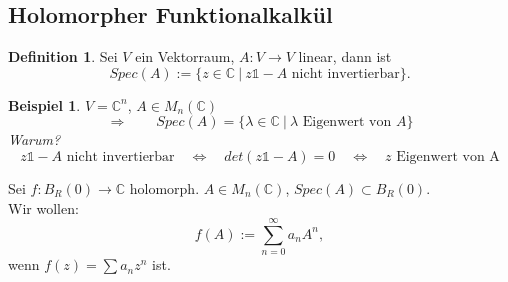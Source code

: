 \documentclass[11pt,titlepage]{article}
\theoremstyle{definition}
\newtheorem{definition}[theorem]{Definition}
\newtheorem{example}[theorem]{Beispiel}
\theoremstyle{remark}
\begin{document}
	\subsection{Holomorpher Funktionalkalkül}
	
	\begin{definition}
		Sei $V$ ein Vektorraum, $A:V\to V$ linear, dann ist
		\[ Spec(A):=\{ z\in\mathbb{C}\ \vert\  z\mathds{1} -A\text{ nicht invertierbar}\}. \]
	\end{definition}
	
	\begin{example}
		$V=\mathbb{C}^n$, $A\in M_n(\mathbb{C})$
		\[ \Rightarrow \qquad Spec(A)=\{\lambda\in\mathbb{C}\ \vert\ \lambda\text{ Eigenwert von }A\}\]
		\textsl{Warum?}
		\[ z\mathds{1}-A\text{ nicht invertierbar} \quad\Leftrightarrow\quad det(z\mathds{1}-A)=0 
		\quad\Leftrightarrow\quad z\text{ Eigenwert von A}\]
	\end{example}
		
	Sei $f:B_R(0)\to\mathbb{C}$ holomorph. $A\in M_n(\mathbb{C})$, $Spec(A)\subset B_R(0)$. \\
	Wir wollen:
	\[  f(A):= \sum_{n=0}^{\infty} a_n A^n ,\]
	wenn $f(z)=\sum a_n z^n$ ist.
	
\end{document}
